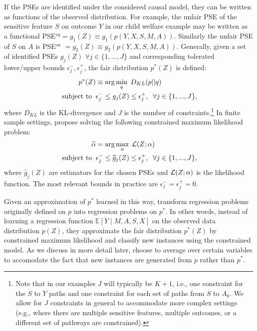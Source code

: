 \documentclass{article}
\begin{document}
If the PSEs are identified under the considered causal model, they can be written as functions of the observed distribution. For example, the unfair PSE of the sensitive feature $S$ on outcome $Y$ in our child welfare example may be written as a functional PSE$^{sy} = g_1(Z) \equiv g_1(p(Y, X, S, M, A))$. Similarly the unfair PSE of $S$ on $A$ is PSE$^{sa}$ $= g_2(Z) \equiv g_2(p(Y, X, S, M, A))$. Generally, given a set of identified PSEs $g_j(Z)$ $\forall j \in \{ 1,..., J \}$ and corresponding tolerated lower/upper bounds $\epsilon_j^-, \epsilon_j^+$, the fair distribution $p^*(Z)$ is defined:
{\small
	\begin{align}
	p^*(Z) &\equiv \arg \min_{q} \hspace{0.1cm} D_{KL}(p||q) \nonumber \\
	\text{ subject to} \hspace{0.2cm} & \epsilon_j^- \leq g_j(Z) \leq \epsilon_j^+, \hspace{0.2cm} \forall j \in \{ 1,...,J \},
	\label{eqn:p-star}
	\end{align}
}%
where $D_{KL}$ is the KL-divergence and $J$ is the number of constraints.\footnote{Note that in our examples $J$ will typically be $K+1$, i.e., one constraint for the $S$ to $Y$ paths and one constraint for each set of paths from $S$ to $A_k$. We allow for $J$ constraints in general to accommodate more complex settings (e.g., where there are multiple sensitive features, multiple outcomes, or a different set of pathways are constrained).} In finite sample settings, \citet{NabiShpitser18Fair} propose solving the following constrained maximum likelihood problem:
{\small
\begin{align}
\widehat{\alpha} &= \arg \max_{\alpha} \hspace{0.1cm} {\cal L}(Z; {\alpha}) \nonumber \\
\text{ subject to} \hspace{0.2cm} & \epsilon_j^- \leq \widehat{g}_j(Z) \leq \epsilon_j^+, \hspace{0.2cm} \forall j \in \{ 1,...,J \},
 \label{eqn:c-mle}
\end{align}
}%
where $\widehat{g}_j(Z)$ are estimators for the chosen PSEs and ${\cal L}(Z; \alpha)$ is the likelihood function. The most relevant bounds in practice are $\epsilon_j^- =  \epsilon_j^+ = 0$.

Given an approximation of $p^*$ learned in this way, \citet{NabiShpitser18Fair} transform regression problems originally defined on $p$ into regression problems on $p^*$.
In other words, instead of learning a regression function $\mathbb{E}[Y \mid M, A, S, X]$ on the observed data distribution $p(Z)$, they approximate the fair distribution $p^*(Z)$ by constrained maximum likelihood and classify new instances using the constrained model. As we discuss in more detail later, \citet{NabiShpitser18Fair} choose to average over certain variables to accomodate the fact that new instances are generated from $p$ rather than $p^*$.
\end{document}
